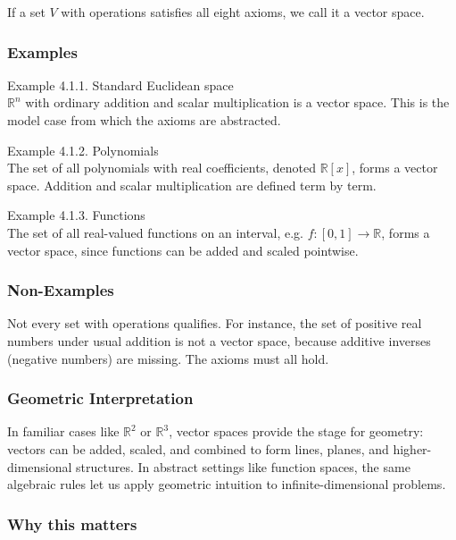 \documentclass[
  12pt,
  a4paper,
]{article}
\begin{document}
If a set \(V\) with operations satisfies all eight axioms, we call it a
vector space.

\subsubsection{Examples}\label{examples-2}

Example 4.1.1. Standard Euclidean space\\
\(\mathbb{R}^n\) with ordinary addition and scalar multiplication is a
vector space. This is the model case from which the axioms are
abstracted.

Example 4.1.2. Polynomials\\
The set of all polynomials with real coefficients, denoted
\(\mathbb{R}[x]\), forms a vector space. Addition and scalar
multiplication are defined term by term.

Example 4.1.3. Functions\\
The set of all real-valued functions on an interval, e.g.
\(f: [0,1] \to \mathbb{R}\), forms a vector space, since functions can
be added and scaled pointwise.

\subsubsection{Non-Examples}\label{non-examples}

Not every set with operations qualifies. For instance, the set of
positive real numbers under usual addition is not a vector space,
because additive inverses (negative numbers) are missing. The axioms
must all hold.

\subsubsection{Geometric
Interpretation}\label{geometric-interpretation-4}

In familiar cases like \(\mathbb{R}^2\) or \(\mathbb{R}^3\), vector
spaces provide the stage for geometry: vectors can be added, scaled, and
combined to form lines, planes, and higher-dimensional structures. In
abstract settings like function spaces, the same algebraic rules let us
apply geometric intuition to infinite-dimensional problems.

\subsubsection{Why this matters}\label{why-this-matters-12}
\end{document}
